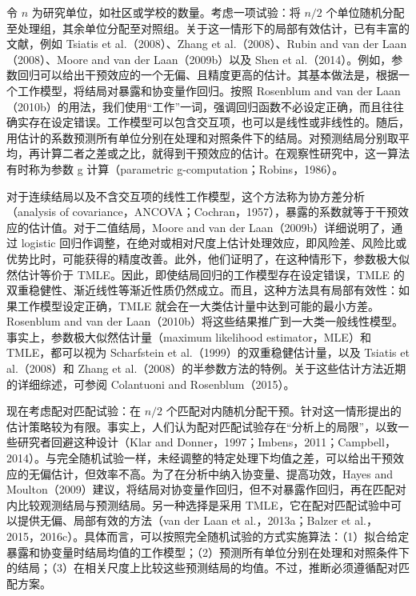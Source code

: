 令 $n$ 为研究单位，如社区或学校的数量。考虑一项试验：将 $n/2$ 个单位随机分配至处理组，其余单位分配至对照组。关于这一情形下的局部有效估计，已有丰富的文献，例如 Tsiatis et al.（2008）、Zhang et al.（2008）、Rubin and van der Laan（2008）、Moore and van der Laan（2009b）以及 Shen et al.（2014）。例如，参数回归可以给出干预效应的一个无偏、且精度更高的估计。其基本做法是，根据一个工作模型，将结局对暴露和协变量作回归。按照 Rosenblum and van der Laan（2010b）的用法，我们使用“工作”一词，强调回归函数不必设定正确，而且往往确实存在设定错误。工作模型可以包含交互项，也可以是线性或非线性的。随后，用估计的系数预测所有单位分别在处理和对照条件下的结局。对预测结局分别取平均，再计算二者之差或之比，就得到干预效应的估计。在观察性研究中，这一算法有时称为参数 g 计算（parametric g-computation；Robins，1986）。

对于连续结局以及不含交互项的线性工作模型，这个方法称为协方差分析（analysis of covariance，ANCOVA；Cochran，1957），暴露的系数就等于干预效应的估计值。对于二值结局，Moore and van der Laan（2009b）详细说明了，通过 logistic 回归作调整，在绝对或相对尺度上估计处理效应，即风险差、风险比或优势比时，可能获得的精度改善。此外，他们证明了，在这种情形下，参数极大似然估计等价于 TMLE。因此，即使结局回归的工作模型存在设定错误，TMLE 的双重稳健性、渐近线性等渐近性质仍然成立。而且，这种方法具有局部有效性：如果工作模型设定正确，TMLE 就会在一大类估计量中达到可能的最小方差。Rosenblum and van der Laan（2010b）将这些结果推广到一大类一般线性模型。事实上，参数极大似然估计量（maximum likelihood estimator，MLE）和 TMLE，都可以视为 Scharfstein et al.（1999）的双重稳健估计量，以及 Tsiatis et al.（2008）和 Zhang et al.（2008）的半参数方法的特例。关于这些估计方法近期的详细综述，可参阅 Colantuoni and Rosenblum（2015）。

现在考虑配对匹配试验：在 $n/2$ 个匹配对内随机分配干预。针对这一情形提出的估计策略较为有限。事实上，人们认为配对匹配试验存在“分析上的局限”，以致一些研究者回避这种设计（Klar and Donner，1997；Imbens，2011；Campbell，2014）。与完全随机试验一样，未经调整的特定处理下均值之差，可以给出干预效应的无偏估计，但效率不高。为了在分析中纳入协变量、提高功效，Hayes and Moulton（2009）建议，将结局对协变量作回归，但不对暴露作回归，再在匹配对内比较观测结局与预测结局。另一种选择是采用 TMLE，它在配对匹配试验中可以提供无偏、局部有效的方法（van der Laan et al.，2013a；Balzer et al.，2015，2016c）。具体而言，可以按照完全随机试验的方式实施算法：（1）拟合给定暴露和协变量时结局均值的工作模型；（2）预测所有单位分别在处理和对照条件下的结局；（3）在相关尺度上比较这些预测结局的均值。不过，推断必须遵循配对匹配方案。

